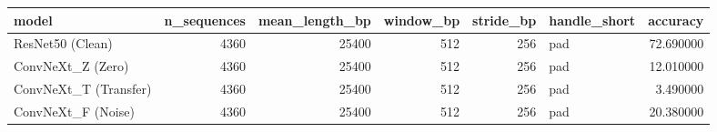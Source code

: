 \begin{tabular}{lrrrrlr}
\toprule
model & n_sequences & mean_length_bp & window_bp & stride_bp & handle_short & accuracy \\
\midrule
ResNet50 (Clean) & 4360 & 25400 & 512 & 256 & pad & 72.690000 \\
ConvNeXt_Z (Zero) & 4360 & 25400 & 512 & 256 & pad & 12.010000 \\
ConvNeXt_T (Transfer) & 4360 & 25400 & 512 & 256 & pad & 3.490000 \\
ConvNeXt_F (Noise) & 4360 & 25400 & 512 & 256 & pad & 20.380000 \\
\bottomrule
\end{tabular}
